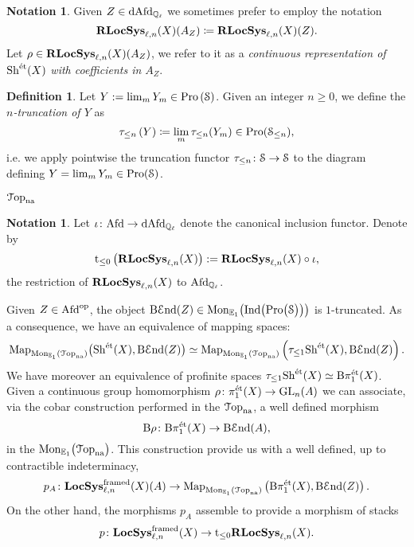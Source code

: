 \documentclass[10pt,a4paper]{amsart}
\numberwithin{equation}{subsection}
\theoremstyle{plain}
\theoremstyle{definition}
\newtheorem{defi}[theorem]{Definition}
\newtheorem{notation}[theorem]{Notation}
\theoremstyle{remark}
\numberwithin{equation}{section}
\begin{document}
\begin{notation}
Given $Z \in \mathrm{dAfd}_{\mathbb{Q}_\ell}$ we sometimes prefer to employ the notation 
	\[
		\mathbf R \mathbf{LocSys}_{\ell, n}(X)(A_Z) \coloneqq \mathbf R \mathbf{LocSys}_{\ell, n}(X)(Z).
	\]
Let $\rho \in \mathbf R \mathbf{LocSys}_{\ell, n}(X)(A_Z)$, 
we refer to it as a \emph{continuous representation of }$\mathrm{Sh}^{\text{\'et}}(X)$ \emph{with coefficients in $A_Z$}.
\end{notation}

\begin{defi}
Let $Y  := \lim_m Y_m \in \mathrm{Pro} \left( \mathcal S \right)$. Given an integer $n \geq 0$, we define the \emph{$n$-truncation of $Y$} as
	\[
		\tau_{\leq n} \left(  Y \right) \coloneqq \lim_m \tau_{\leq n  } ( Y_m)  \in \mathrm{Pro}( \mathcal S_{\leq n} ),
	\]
i.e. we apply pointwise the truncation functor $\tau_{\leq n} \colon \mathcal S \to \mathcal S$ to the diagram defining $Y = \lim_m Y_m \in \mathrm{Pro} ( \mathcal S)$.
\end{defi}

$\mathcal{T} \mathrm{op}_{\mathrm{na}}$

\begin{notation}
Let $\iota \colon \mathrm{Afd} \to \mathrm{dAfd}_{\mathbb{Q}_\ell}$ denote the canonical inclusion functor. Denote by
	\[
		\mathrm t_{\leq 0} \left( \mathbf R \mathbf{LocSys}_{\ell, n}(X) \right) := \mathbf R \mathbf{LocSys}_{\ell, n}(X) \circ \iota,
	\]
the restriction of $\mathbf R \mathbf{LocSys}_{\ell, n}(X)$ to $\mathrm{Afd}_{\mathbb{Q}_\ell}$. 

Given $Z \in \mathrm{Afd}^{\mathrm{op}}$, the object $\mathrm{B} \mathcal E \mathrm{nd}(Z) \in \mathrm{Mon}_{\mathbb E_1 }\big(  \mathrm{Ind} \big( \mathrm{Pro} \big( \mathcal S \big) \big)  \big) $ is $1$-truncated. As a consequence, we have an equivalence of mapping spaces:
	\[
		\mathrm{Map}_{\mathrm{Mon}_{\mathbb E_1} \left(\mathcal{T} \mathrm{op}_{\mathrm{na}} \right) } \big( \mathrm{Sh}^{\text{\'et}} (X), \mathrm{B} \mathcal E \mathrm{nd}(Z) \big) \simeq \mathrm{Map}_{\mathrm{Mon}_{\mathbb E_1} \left(\mathcal{T} \mathrm{op}_{\mathrm{na}} \right) } \left( \tau_{\leq 1} \mathrm{Sh}^{\text{\'et}} (X), \mathrm{B} \mathcal E \mathrm{nd}(Z)\right).
	\]
We have moreover an equivalence of profinite spaces $\tau_{\leq 1} \mathrm{Sh}^{\text{\'et}}(X) \simeq \mathrm B \pi_1^{\text{\'et}}(X)$. Given a continuous group homomorphism $\rho \colon \pi_1^{\text{\'et}}(X) \to \mathrm{GL}_n(A)$ we can associate, via the cobar construction performed in
the \infcat $\mathcal{T}  \mathrm{op}_{\mathrm{na}}$, a well defined morphism
	\[
		\mathrm{B} \rho \colon \mathrm{B} \pi_1^{\text{\'et}}(X) \to \mathrm{B} \mathcal E \mathrm{nd}(A),
	\]
in the \infcat $\mathrm{Mon}_{\mathbb E_1} \big( \mathcal{T} \mathrm{op}_{\mathrm{na}} \big)$. This construction provide us with a well defined, up to contractible indeterminacy,
	\[
		p_A \colon \mathbf{LocSys}_{\ell, n}^{\mathrm{framed}} (X)(A) \to \mathrm{Map}_{\mathrm{Mon}_{\mathbb E_1} \left(\mathcal{T} \mathrm{op}_{\mathrm{na}} \right) } \left(\mathrm{B} \pi_1^{\text{\'et}}(X), \mathrm{B} \mathcal E \mathrm{nd}(Z) \right). 
	\]
On the other hand, the morphisms $p_A$ assemble to provide a morphism of stacks
	\[
		p \colon \mathbf{LocSys}_{\ell, n}^{\mathrm{framed}}(X) \to \mathrm{t}_{\leq 0} \mathbf R \mathbf{LocSys}_{\ell, n}(X) .
	\]
\end{notation}
\end{document}
